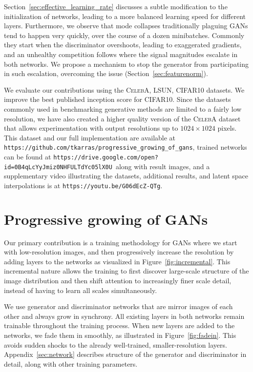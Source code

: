 Section~\ref{sec:effective_learning_rate} discusses a subtle modification to the initialization of networks, leading to a more balanced learning speed for different layers. Furthermore, we observe that mode collapses traditionally plaguing GANs tend to happen very quickly, over the course of a dozen minibatches. Commonly they start when the discriminator overshoots, leading to exaggerated gradients, and an unhealthy competition follows where the signal magnitudes escalate in both networks. We propose a mechanism to stop the generator from participating in such escalation, overcoming the issue (Section~\ref{sec:featurenorm}).

We evaluate our contributions using the \textsc{CelebA}, \textsc{LSUN}, \textsc{CIFAR10} datasets. We improve the best published inception score for \textsc{CIFAR10}. 
Since the datasets commonly used in benchmarking generative methods are limited to a fairly low resolution, we have also created a higher quality version of the \textsc{CelebA} dataset that allows experimentation with output resolutions up to $1024\times1024$ pixels. This dataset and our full implementation are available at {\small\verb|https://github.com/tkarras/progressive_growing_of_gans|}, trained networks can be found at \texttt{\small{https://drive.google.com/open?id=0B4qLcYyJmiz0NHFULTdYc05lX0U}}~along with result images, and a supplementary video illustrating the datasets, additional results, and latent space interpolations is at \texttt{\small{https://youtu.be/G06dEcZ-QTg}}.

\section{Progressive growing of GANs}
\label{sec:progressive}

Our primary contribution is a training methodology for GANs where we start with low-resolution images, and then progressively increase the resolution by adding layers to the networks as visualized in Figure~\ref{fig:incremental}. This incremental nature allows the training to first discover large-scale structure of the image distribution and then shift attention to increasingly finer scale detail, instead of having to learn all scales simultaneously.

We use generator and discriminator networks that are mirror images of each other and always grow in synchrony. All existing layers in both networks remain trainable throughout the training process. When new layers are added to the networks, we fade them in smoothly, as illustrated in Figure~\ref{fig:fadein}. This avoids sudden shocks to the already well-trained, smaller-resolution layers. Appendix~\ref{sec:network} describes structure of the generator and discriminator in detail, along with other training parameters. 

